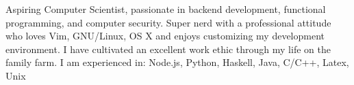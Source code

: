 

\begin{cvparagraph}

Aspiring Computer Scientist, passionate in backend development, functional programming, 
and computer security. Super nerd with a professional attitude who loves Vim, GNU/Linux, OS X and enjoys customizing 
my development environment. 
I have cultivated an excellent work ethic through my life on the family farm.
I am experienced in: Node.js, Python, Haskell, Java, C/C++, Latex, Unix 
\end{cvparagraph}
